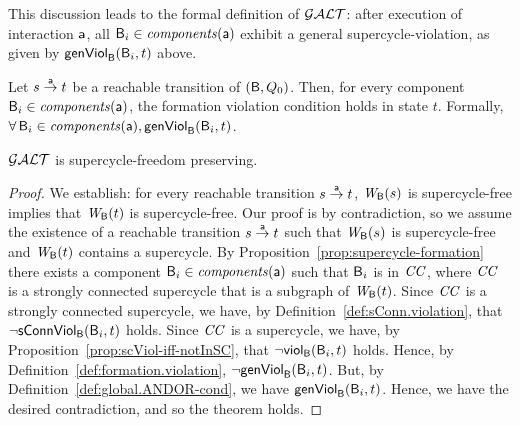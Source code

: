This discussion leads to the formal definition of $\GAO$: 
after execution of interaction $\act$, all $\B_i \in \cmps{\act}$ exhibit a general supercycle-violation, as given by $\genViol{\B_i}{t}$ above.

\begin{definition} \label{def:global.ANDOR-cond} \label{defn:global.ANDOR-cond} 
Let $s \goesto[\act] t$ be a reachable transition of $(\B, Q_0)$.
Then, for every component $\B_i \in \comps{\act}$, the formation violation condition holds in state $t$.
Formally,\\
\ind  $\fas \B_i \in \comps{\act}, \genViol{\B_i}{t}$.
\end{definition}


\begin{theorem} \label{thm:GAO.SC-free-preserving}
$\GAO$ is supercycle-freedom preserving.
\end{theorem}
%
\begin{proof}
We establish:
for every reachable transition $s \la{\act} t$,
$\wfg{\B}{s}$ is supercycle-free implies that $\wfg{\B}{t}$ is
supercycle-free. Our proof is by contradiction, so we assume the existence of a reachable transition
$s \la{\act} t$ such that $\wfg{\B}{s}$ is supercycle-free and $\wfg{\B}{t}$ contains a supercycle.
%
By Proposition~\ref{prop:supercycle-formation}
 there exists a component $\B_i \in \cmps{\act}$ such that $\B_i$ is in $\CC$, where 
$\CC$ is a strongly connected supercycle that is a subgraph of $\wfg{\B}{t}$.
%
Since $\CC$ is a strongly connected supercycle, we have,
 by Definition~\ref{def:sConn.violation}, that $\neg \connViol{\B_i}{t}$ holds.
%
Since $\CC$ is a supercycle, we have, by Proposition~\ref{prop:scViol-iff-notInSC}, 
that $\neg \scV{\B_i}{t}$ holds. %
%
Hence, by Definition~\ref{def:formation.violation}, $\neg \formViol{\B_i}{t}$.
But, by Definition~\ref{def:global.ANDOR-cond}, we have $\formViol{\B_i}{t}$.
Hence, we have the desired contradiction, and so the theorem holds.
\end{proof}


